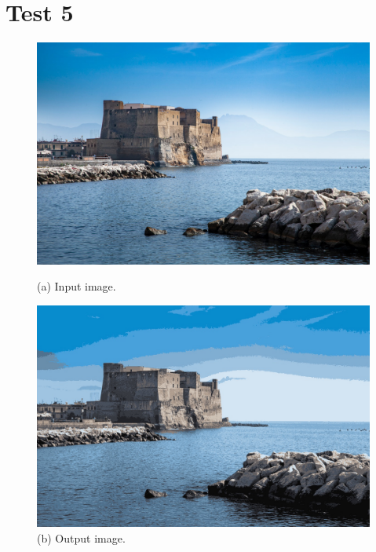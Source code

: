\section{Test 5}
\begin{figure}[H]
    \centering
    \begin{minipage}[b]{0.45\textwidth}
        \centering
        \includegraphics[width=\textwidth]{images/input_image_t5.jpg}
        \caption{(a) Input image.}
        \label{fig:test_5_input}
    \end{minipage}
    \hfill
    \begin{minipage}[b]{0.45\textwidth}
        \centering
        \includegraphics[width=\textwidth]{images/output_image_t5.jpg}
        \caption{(b) Output image.}
        \label{fig:test_5_output}
    \end{minipage}
    \end{figure}


